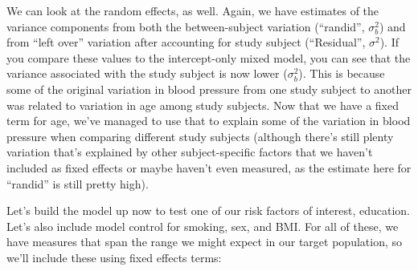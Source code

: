 \documentclass[
]{book}
\newenvironment{Shaded}{\begin{snugshade}}{\end{snugshade}}
\newcommand{\DataTypeTok}[1]{\textcolor[rgb]{0.13,0.29,0.53}{#1}}
\newcommand{\DecValTok}[1]{\textcolor[rgb]{0.00,0.00,0.81}{#1}}
\newcommand{\KeywordTok}[1]{\textcolor[rgb]{0.13,0.29,0.53}{\textbf{#1}}}
\newcommand{\NormalTok}[1]{#1}
\newcommand{\OperatorTok}[1]{\textcolor[rgb]{0.81,0.36,0.00}{\textbf{#1}}}
\newcommand{\StringTok}[1]{\textcolor[rgb]{0.31,0.60,0.02}{#1}}
\begin{document}
We can look at the random effects, as well. Again, we have estimates of the
variance components from both the between-subject variation (``randid'', \(\sigma_{b}^2\))
and from ``left over'' variation after accounting for study subject (``Residual'',
\(\sigma^2\)). If you compare these values to the intercept-only mixed model, you
can see that the variance associated with the study subject is now lower (\(\sigma_{b}^2\)).
This is because some of the original variation in blood pressure from one study
subject to another was related to variation in age among study subjects. Now that
we have a fixed term for age, we've managed to use that to explain some of the
variation in blood pressure when comparing different study subjects (although there's
still plenty variation that's explained by other subject-specific factors
that we haven't included as fixed effects or maybe haven't even measured,
as the estimate here for ``randid'' is still pretty high).

Let's build the model up now to test one of our risk factors of interest, education.
Let's also include model control for smoking, sex, and BMI. For all of these,
we have measures that span the range we might expect in our target population,
so we'll include these using fixed effects terms:

\begin{Shaded}
\end{Shaded}
\end{document}
